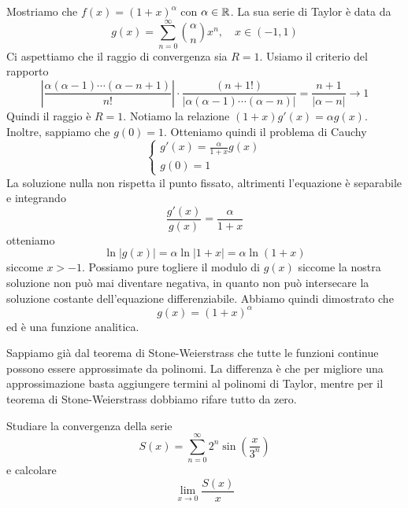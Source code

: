 \documentclass[a4paper]{article}
\begin{document}
\begin{snippetexample}{}
    Mostriamo che \(f(x) = (1 + x)^\alpha\) con \(\alpha \in \mathbb{R}\).
    La sua serie di Taylor è data da
    \[
        g(x) = \sum_{n=0}^\infty \binom{\alpha}{n}x^n, \quad x\in(-1,1)
    \]
    Ci aspettiamo che il raggio di convergenza sia
    \(R=1\). Usiamo il criterio del rapporto
    \[
        \left|
            \frac{\alpha(\alpha-1)\cdots(\alpha - n + 1)}{n!}
        \right| \cdot \frac{(n+1!)}{|\alpha(\alpha-1)\cdots(\alpha-n)|}
        = \frac{n+1}{|\alpha- n|} \to 1
    \]
    Quindi il raggio è \(R=1\).
    Notiamo la relazione \((1 + x)g'(x) = \alpha g(x)\).
    Inoltre, sappiamo che \(g(0) = 1\).
    Otteniamo quindi il problema di Cauchy
    \[
        \begin{cases}
            g'(x) = \frac{\alpha}{1 + x}g(x) \\
            g(0) = 1
        \end{cases}
    \]
    La soluzione nulla non rispetta il punto fissato, altrimenti l'equazione è separabile e integrando
    \[
        \frac{g'(x)}{g(x)} = \frac{\alpha}{1 + x}
    \]
    otteniamo
    \[
        \ln|g(x)| = \alpha \ln |1 + x| =  \alpha \ln (1 + x)
    \]
    siccome \(x > -1\). Possiamo pure togliere il modulo di \(g(x)\)
    siccome la nostra soluzione non può mai diventare negativa, in quanto non può
    intersecare la soluzione costante dell'equazione differenziabile. Abbiamo quindi dimostrato che
    \[
        g(x) = {(1 + x)}^\alpha
    \]
    ed è una funzione analitica.
\end{snippetexample}

Sappiamo già dal teorema di Stone-Weierstrass che tutte le funzioni continue
possono essere approssimate da polinomi.
La differenza è che per migliore una approssimazione basta aggiungere termini
al polinomi di Taylor, mentre per il teorema di Stone-Weierstrass
dobbiamo rifare tutto da zero.

\begin{snippetexercise}{}
    Studiare la convergenza della serie
    \[
        S(x) = \sum_{n=0}^\infty 2^n \sin\left(\frac{x}{3^n}\right)
    \]
    e calcolare
    \[
        \lim_{x \to 0} \frac{S(x)}{x}
    \]
\end{snippetexercise}
\end{document}

